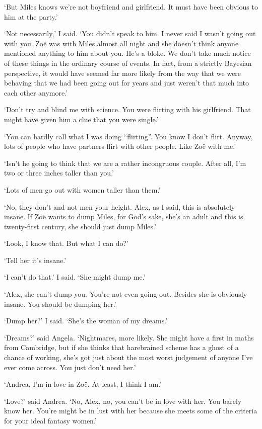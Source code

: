 `But Miles knows we're not boyfriend and girlfriend. It must have
been obvious to him at the party.'

`Not necessarily,' I said. `You didn't speak to him. I never said I
wasn't going out with you. Zoë was with Miles almost all night
and she doesn't think anyone mentioned anything to him about you.
He's a bloke. We don't take much notice of these things in the
ordinary course of events. In fact, from a strictly Bayesian
perspective, it would have seemed far more likely from the way that
we were behaving that we had been going out for years and just
weren't that much into each other anymore.'

`Don't try and blind me with science. You were flirting with his
girlfriend. That might have given him a clue that you were single.'

`You can hardly call what I was doing ``flirting''. You know I don't
flirt. Anyway, lots of people who have partners flirt with other
people. Like Zoë with me.'

`Isn't he going to think that we are a rather incongruous couple.
After all, I'm two or three inches taller than you.'

`Lots of men go out with women taller than them.'

`No, they don't and not men your height. Alex, as I said, this is
absolutely insane. If Zoë wants to dump Miles, for God's sake,
she's an adult and this is twenty-first century, she should just
dump Miles.'

`Look, I know that. But what I can do?'

`Tell her it's insane.'

`I can't do that.' I said. `She might dump me.'

`Alex, she can't dump you. You're not even going out. Besides she is
obviously insane. You should be dumping her.'

`Dump her?' I said. `She's the woman of my dreams.'

`Dreams?' said Angela. `Nightmares, more likely. She might have a
first in maths from Cambridge, but if she thinks that harebrained
scheme has a ghost of a chance of working, she's got just about the
most worst judgement of anyone I've ever come across. You just don't
need her.'

`Andrea, I'm in love in Zoë. At least, I think I am.'

`Love?' said Andrea. `No, Alex, no, you can't be in love with her.
You barely know her. You're might be in lust with her because she
meets some of the criteria for your ideal fantasy women.'

